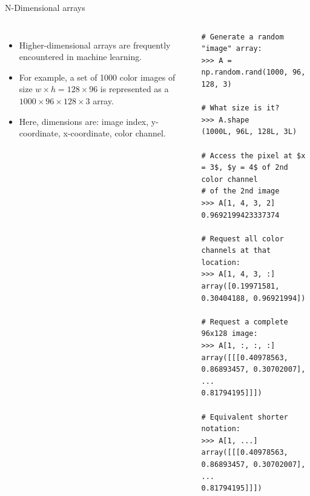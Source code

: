 \documentclass[10pt, aspectratio=169]{beamer} %
\begin{document}
\begin{frame}[fragile]
 {N-Dimensional arrays}
\begin{columns}
\begin{itemize}
\item Higher-dimensional arrays are frequently encountered in machine learning.
\item For example, a set of 1000 color images of size $w\times h = 128\times96$ is represented
as a $1000 \times 96\times 128\times 3$ array.
\item Here, dimensions are: image index, y-coordinate, x-coordinate, color channel.
\end{itemize}
\begin{lstlisting}
# Generate a random "image" array:
>>> A = np.random.rand(1000, 96, 128, 3)

# What size is it?
>>> A.shape
(1000L, 96L, 128L, 3L)

# Access the pixel at $x = 3$, $y = 4$ of 2nd color channel 
# of the 2nd image
>>> A[1, 4, 3, 2]
0.9692199423337374

# Request all color channels at that location:
>>> A[1, 4, 3, :]
array([0.19971581, 0.30404188, 0.96921994])

# Request a complete 96x128 image:
>>> A[1, :, :, :]
array([[[0.40978563, 0.86893457, 0.30702007], ...
0.81794195]]])

# Equivalent shorter notation:
>>> A[1, ...]
array([[[0.40978563, 0.86893457, 0.30702007], ...
0.81794195]]])
\end{lstlisting}
\end{columns}
\end{frame}
\end{document}

